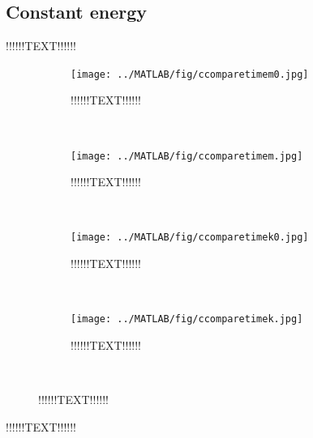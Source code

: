 \subsection{Constant energy}%
!!!!!!TEXT!!!!!! 
\begin{figure}[H]
        \centering
        \begin{subfigure}[b]{0.3\textwidth}
                \texttt{[image: ../MATLAB/fig/ccomparetimem0.jpg]}
                \caption{ !!!!!!TEXT!!!!!! }
                \label{fig:ccomparetimem0}
        \end{subfigure}
        ~
        \begin{subfigure}[b]{0.3\textwidth}
                \texttt{[image: ../MATLAB/fig/ccomparetimem.jpg]}
                \caption{ !!!!!!TEXT!!!!!! }
                \label{fig:ccomparetimem}
        \end{subfigure}
        ~

        
        \begin{subfigure}[b]{0.3\textwidth}
                \texttt{[image: ../MATLAB/fig/ccomparetimek0.jpg]}
                \caption{ !!!!!!TEXT!!!!!! }
                \label{fig:ccomparetimek0}
        \end{subfigure}
        ~
        \begin{subfigure}[b]{0.3\textwidth}
                \texttt{[image: ../MATLAB/fig/ccomparetimek.jpg]}
                \caption{ !!!!!!TEXT!!!!!! }
                \label{fig:ccomparetimek}
        \end{subfigure}
        ~

        \caption{ !!!!!!TEXT!!!!!!}
        \label{fig:ccomparetime}
\end{figure}
!!!!!!TEXT!!!!!! \\
